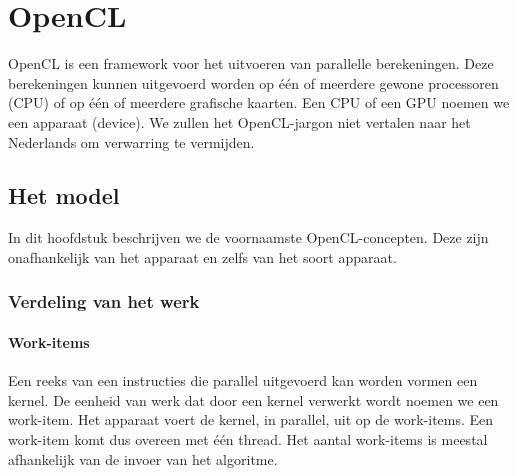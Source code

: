 \chapter{OpenCL}
\label{h:opencl} 
OpenCL is een framework voor het uitvoeren van parallelle berekeningen. Deze berekeningen kunnen uitgevoerd worden op \'e\'en of meerdere gewone processoren (CPU) of op \'e\'en of meerdere grafische kaarten. Een CPU of een GPU noemen we een apparaat (device). We zullen het OpenCL-jargon niet vertalen naar het Nederlands om verwarring te vermijden.

\section{Het model}
In dit hoofdstuk beschrijven we de voornaamste OpenCL-concepten. Deze zijn onafhankelijk van het apparaat en zelfs van het soort apparaat.
\subsection{Verdeling van het werk}
\subsubsection{Work-items}
Een reeks van een instructies die parallel uitgevoerd kan worden vormen een kernel. De eenheid van werk dat door een kernel verwerkt wordt noemen we een work-item. Het apparaat voert de kernel, in parallel, uit op de work-items. Een work-item komt dus overeen met \'e\'en thread. Het aantal work-items is meestal afhankelijk van de invoer van het algoritme.

